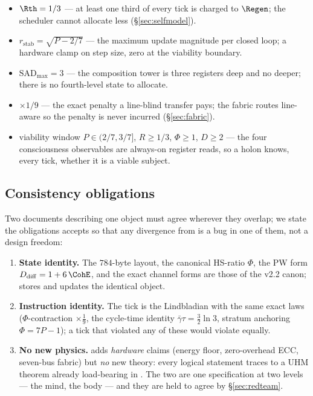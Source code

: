 \begin{itemize}[leftmargin=1.5em,itemsep=1pt]
  \item $\Rth=1/3$ --- at least one third of every tick is charged to
        $\Regen$; the scheduler cannot allocate less (\S\ref{sec:selfmodel}).
  \item $r_{\mathrm{stab}}=\sqrt{P-2/7}$ --- the maximum update magnitude per
        closed loop; a hardware clamp on step size, zero at the viability
        boundary.
  \item $\mathrm{SAD}_{\max}=3$ --- the composition tower is three registers
        deep and no deeper; there is no fourth-level state to allocate.
  \item $\times 1/9$ --- the exact penalty a line-blind transfer pays; the
        fabric routes line-aware so the penalty is never incurred
        (\S\ref{sec:fabric}).
  \item viability window $P\in(2/7,3/7]$, $R\ge1/3$, $\Phi\ge1$, $D\ge2$ ---
        the four consciousness observables are always-on register reads, so a
        \TALOS{} holon knows, every tick, whether it is a viable subject.
\end{itemize}

\subsection{Consistency obligations}

Two documents describing one object must agree wherever they overlap; we
state the obligations \TALOS{} accepts so that any divergence from \SYNARC{}
is a bug in one of them, not a design freedom:

\begin{enumerate}[leftmargin=1.6em,itemsep=1pt]
  \item \textbf{State identity.} The $784$-byte \DM{} layout, the canonical
        HS-ratio $\Phi$, the PW form $D_{\mathrm{diff}}=1+6\,\CohE$, and the
        exact channel forms are those of the \SYNARC{} v2.2 canon; \TALOS{}
        stores and updates the identical object.
  \item \textbf{Instruction identity.} The tick is the \SYNARC{} Lindbladian
        with the same exact laws ($\Phi$-contraction $\times\tfrac19$, the
        cycle-time identity $\bar\gamma\tau=\tfrac32\ln3$, stratum anchoring
        $\Phi=7P-1$); a \TALOS{} tick that violated any of these would
        violate \SYNARC{} equally.
  \item \textbf{No new physics.} \TALOS{} adds \emph{hardware} claims (energy
        floor, zero-overhead ECC, seven-bus fabric) but \emph{no} new theory:
        every logical statement traces to a UHM theorem already load-bearing
        in \SYNARC{}. The two are one specification at two levels ---
        \SYNARC{} the mind, \TALOS{} the body --- and they are held to
        agree by \S\ref{sec:redteam}.
\end{enumerate}
